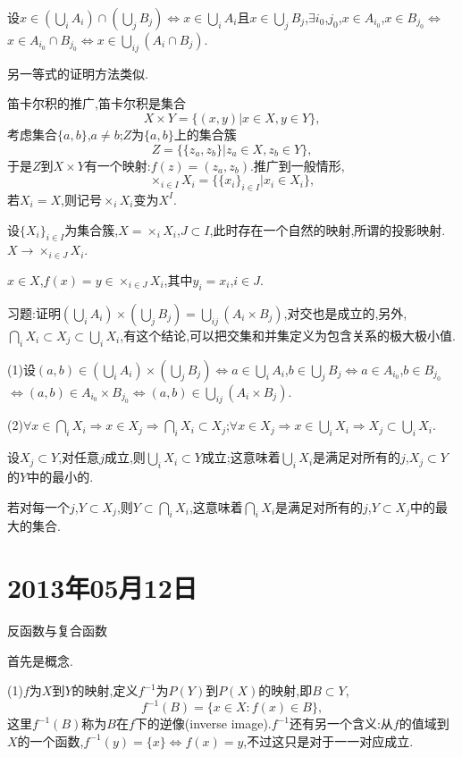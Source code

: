 \documentclass[12pt,a4paper,openany]{book}
\begin{document}
设$x \in (\bigcup_{i}{A_i}) \cap (\bigcup_{j}{B_j})$$\Leftrightarrow$$x \in \bigcup_{i}{A_i}$且$x \in \bigcup_{j}{B_j}$,$\exists i_0$,$j_0$,$x \in A_{i_0}$,$x \in B_{j_0}$$\Leftrightarrow$$x \in A_{i_0} \cap B_{j_0}$$\Leftrightarrow$$x \in \bigcup_{ij}{(A_i \cap B_j)}$.

另一等式的证明方法类似.

笛卡尔积的推广,笛卡尔积是集合
\[
X \times Y = \{(x,y)|x \in X, y \in Y\},
\]
考虑集合$\{a,b\}$,$a \neq b$;$Z$为$\{a,b\}$上的集合簇
\[
Z = \{\{z_a,z_b\}|z_a \in X, z_b \in Y\},
\]
于是$Z$到$X \times Y$有一个映射:$f(z)=(z_a,z_b)$.推广到一般情形,
\[
\times_{i \in I}{X_i} = \{\{x_i\}_{i \in I}|x_i \in X_i\},
\]
若$X_i=X$,则记号$\times_i{X_i}$变为$X^I$.

设$\{X_i\}_{i \in I}$为集合簇,$X = \times_i{X_i}$,$J \subset I$,此时存在一个自然的映射,所谓的投影映射.$X \to \times_{i \in J}{X_i}$.

$x \in X$,$f(x)=y \in \times_{i \in J}{X_i}$,其中$y_i=x_i$,$i \in J$.

习题:证明$(\bigcup_{i}{A_i}) \times (\bigcup_{j}{B_j}) = \bigcup_{ij}{(A_i \times B_j)}$,对交也是成立的,另外,$\bigcap_{i}{X_i} \subset X_j \subset \bigcup_{i}{X_i}$,有这个结论,可以把交集和并集定义为包含关系的极大极小值.

(1)设$(a,b) \in (\bigcup_{i}{A_i}) \times (\bigcup_{j}{B_j})$$\Leftrightarrow$$a \in \bigcup_{i}{A_i}$,$b \in \bigcup_{j}{B_j}$$\Leftrightarrow$$a \in A_{i_0}$,$b \in B_{j_0}$$\Leftrightarrow$$(a,b)\in A_{i_0} \times B_{j_0}$$\Leftrightarrow$$(a,b)\in \bigcup_{ij}{(A_i \times B_j)}$.

(2)$\forall x \in \bigcap_{i}{X_i}$$\Rightarrow$$x \in X_j$$\Rightarrow$$\bigcap_{i}{X_i}\subset X_j$;$\forall x \in X_j$$\Rightarrow$$x \in \bigcup_{i}{X_i}$$\Rightarrow$$X_j \subset \bigcup_{i}{X_i}$.

设$X_j \subset Y$,对任意$j$成立,则$\bigcup_{i}{X_i} \subset Y$成立;这意味着$\bigcup_{i}{X_i}$是满足对所有的$j$,$X_j \subset Y$的$Y$中的最小的.

若对每一个$j$,$Y \subset X_j$,则$Y \subset \bigcap_{i}{X_i}$,这意味着$\bigcap_{i}{X_i}$是满足对所有的$j$,$Y \subset X_j$中的最大的集合.


\section{2013年05月12日}
反函数与复合函数

首先是概念.

(1)$f$为$X$到$Y$的映射,定义$f^{-1}$为$P(Y)$到$P(X)$的映射,即$B \subset Y$,
\[
f^{-1}(B) = \{x \in X:f(x) \in B\},
\]
这里$f^{-1}(B)$称为$B$在$f$下的逆像(inverse image).$f^{-1}$还有另一个含义:从$f$的值域到$X$的一个函数,$f^{-1}(y)=\{x\}$$\Leftrightarrow$$f(x)=y$,不过这只是对于一一对应成立.
\end{document}
